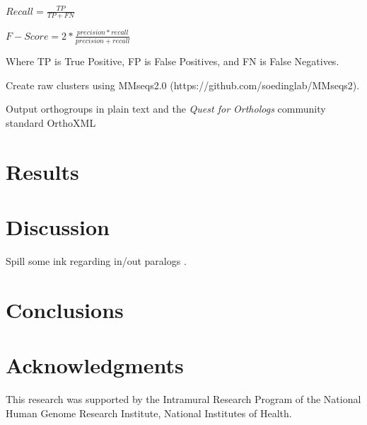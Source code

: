 \documentclass[nogrid]{MBE}%
\begin{document}
$Recall = \frac{TP}{TP + FN}$

$F-Score = 2 * \frac{precision * recall}{precision + recall}$

Where TP is True Positive, FP is False Positives, and FN is False Negatives. 

Create raw clusters using MMseqs2.0 (https://github.com/soedinglab/MMseqs2).

Output orthogroups in plain text and the \textit{Quest for Orthologs} community standard OrthoXML \cite{Dessimoz:2012dj}

\section{Results}

\section{Discussion}
Spill some ink regarding in/out paralogs \cite{Sonnhammer:2002vm,Tekaia:2016ga}.

\section{Conclusions}

\section{Acknowledgments}
This research was supported by the Intramural Research Program of the National Human Genome Research Institute, National Institutes of Health.





\end{document}
